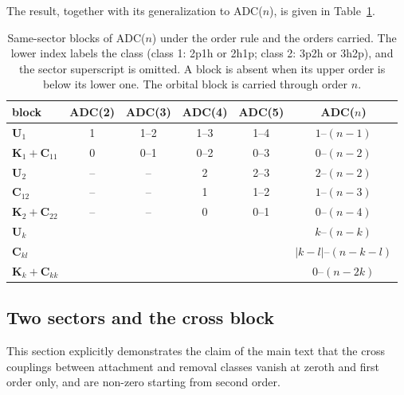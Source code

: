 \documentclass[aip,jcp,reprint,noshowkeys,superscriptaddress]{revtex4-2}
\theoremstyle{plain}
\theoremstyle{definition}
\theoremstyle{remark}
\begin{document}
The result, together with its generalization to ADC($n$), is given in Table~\ref{tab:si:sameblocks}.
\begin{table}[htb]
\caption{Same-sector blocks of ADC($n$) under the order rule and the orders carried. The lower index labels the class (class 1: 2p1h or 2h1p; class 2: 3p2h or 3h2p), and the sector superscript is omitted. A block is absent when its upper order is below its lower one. The orbital block is carried through order $n$.}
\label{tab:si:sameblocks}
\begin{tabular}{lccccc}
\hline\hline
block & ADC(2) & ADC(3) & ADC(4) & ADC(5) & ADC($n$)\\
\hline
$\mathbf{U}_1$ & 1 & 1--2 & 1--3 & 1--4 & $1$--$(n-1)$\\
$\mathbf{K}_1+\mathbf{C}_{11}$ & 0 & 0--1 & 0--2 & 0--3 & $0$--$(n-2)$\\
$\mathbf{U}_2$ & -- & -- & 2 & 2--3 & $2$--$(n-2)$\\
$\mathbf{C}_{12}$ & -- & -- & 1 & 1--2 & $1$--$(n-3)$\\
$\mathbf{K}_2+\mathbf{C}_{22}$ & -- & -- & 0 & 0--1 & $0$--$(n-4)$\\
\hline
$\mathbf{U}_k$ & & & & & $k$--$(n-k)$\\
$\mathbf{C}_{kl}$ & & & & & $|k-l|$--$(n-k-l)$\\
$\mathbf{K}_k+\mathbf{C}_{kk}$ & & & & & $0$--$(n-2k)$\\
\hline\hline
\end{tabular}
\end{table}

\subsection{Two sectors and the cross block}
\label{sec:si:cross}

This section explicitly demonstrates the claim of the main text that the cross couplings between attachment and removal classes vanish at zeroth and first order only, and are non-zero starting from second order.
\end{document}
